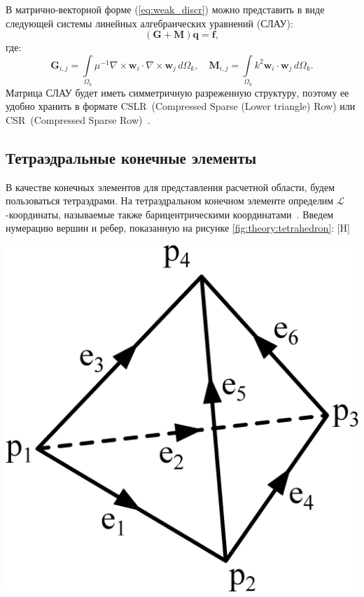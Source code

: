 \documentclass[a4paper,14pt]{article}
\makeatletter
\renewenvironment{figure}[1][\fps@figure]{
  \edef\@tempa{\noexpand\@float{figure}[#1]}
  \@tempa
  \addtocounter{foofigure}{1}
}{
  \end@float
}
\makeatother
\begin{document}
В матрично-векторной форме (\ref{eq:weak_discr}) можно представить в виде следующей системы линейных алгебраических уравнений (СЛАУ):
\begin{equation}
	( \mathbf{G} + \mathbf{M} )\mathbf{q} = \mathbf{f} , \label{eq:form_29}
\end{equation}
где:
\begin{equation*}
	\mathbf{G}_{ i,j } = \int\limits_{\Omega_k} \mu^{-1} \nabla \times \mathbf{w}_i \cdot \nabla \times \mathbf{w}_j \,d\Omega_k , \text{~~~}
	\mathbf{M}_{ i,j } = \int\limits_{\Omega_k} k^2 \mathbf{w}_i \cdot \mathbf{w}_j \,d\Omega_k . \label{eq:local_matrixes}
\end{equation*}
Матрица СЛАУ будет иметь симметричную разреженную структуру, поэтому ее удобно хранить в формате CSLR~(Compressed Sparse (Lower triangle) Row) или CSR~(Compressed Sparse Row)~\citep{balandin_slae}.


\subsection{Тетраэдральные конечные элементы}

В качестве конечных элементов для представления расчетной области, будем пользоваться тетраэдрами. На тетраэдральном конечном элементе определим $\mathcal{L}$-ко\-ор\-ди\-на\-ты, называемые также барицентрическими координатами~\citep{soloveychick}. Введем нумерацию вершин и ребер, показанную на рисунке \ref{fig:theory:tetrahedron}:
\begin{figure}[H]
	\centering
	\includegraphics[scale=0.25]{theory/tetrahedron.eps}
	\caption{тетраэдральный конечный элемент}
	\label{fig:theory:tetrahedron}
\end{figure}
\end{document}
